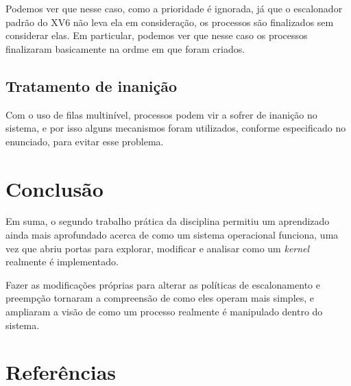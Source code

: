 \documentclass{article}
\begin{document}
Podemos ver que nesse caso, como a prioridade é ignorada, já que o escalonador
padrão do XV6 não leva ela em consideração, os processos são finalizados sem
considerar elas. Em particular, podemos ver que nesse caso os processos
finalizaram basicamente na ordme em que foram criados.

\subsection{Tratamento de inanição}

Com o uso de filas multinível, processos podem vir a sofrer de inanição no
sistema, e por isso alguns mecanismos foram utilizados, conforme especificado
no enunciado, para evitar esse problema.

\section{Conclusão}

Em suma, o segundo trabalho prática da disciplina
permitiu um aprendizado ainda mais aprofundado acerca de como um sistema
operacional funciona, uma vez que abriu portas para explorar, modificar e
analisar como um \textit{kernel} realmente é implementado.

Fazer as modificações próprias para alterar as políticas de escalonamento e
preempção tornaram a compreensão de como eles operam mais simples, e ampliaram
a visão de como um processo realmente é manipulado dentro do sistema.

\section{Referências}
\end{document}
